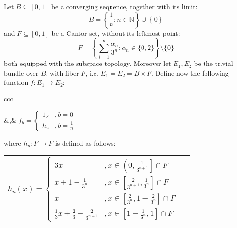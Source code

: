 \begin{example}\label{ex:counterexample} Let $B\subseteq[0,1]$ be a converging sequence, together with its limit:
\[B=\left\{\frac{1}{n}:n\in\mathbb{N}\right\}\cup\left\{0\right\}\]
and $F\subseteq[0,1]$ be a Cantor set, without its leftmost point:
\[F=\left\{\sum_{i=1}^{\infty}\frac{\alpha_n}{3^n}:\alpha_n\in\{0,2\}\right\}\setminus\{0\}\]
both equipped with the subspace topology. Moreover let $E_1,E_2$ be the trivial bundle over $B$, with fiber $F$, i.e. $E_1=E_2=B\times F$. Define now the following function $f:E_1\to E_2$:
\begin{center}
\begin{tabular}{ccc}
&,&
$\displaystyle f_b=\left\{\begin{array}{ll}
1_F&,b=0\\[1.2em]
h_n&,b=\frac{1}{n}
\end{array}\right.$
\end{tabular}
\end{center}
where $h_n:F\to F$ is defined as follows:
\begin{center}
\begin{tabular}{cc}
$\displaystyle h_n(x)=\left\{\begin{array}{ll}
3x&,x\in\left(0,\frac{1}{3^{n+1}}\right]\cap F\\[1em]
x+1-\frac{1}{3^n}&,x\in\left[\frac{2}{3^{n+1}},\frac{1}{3^n}\right]\cap F\\[1em]
x&,x\in\left[\frac{2}{3^n},1-\frac{2}{3^n}\right]\cap F\\[1em]
\frac{1}{3}x+\frac{2}{3}-\frac{2}{3^{n+1}}&,x\in\left[1-\frac{1}{3^n},1\right]\cap F
\end{array}\right.$
&
\end{tabular}
\end{center}
\end{example}
